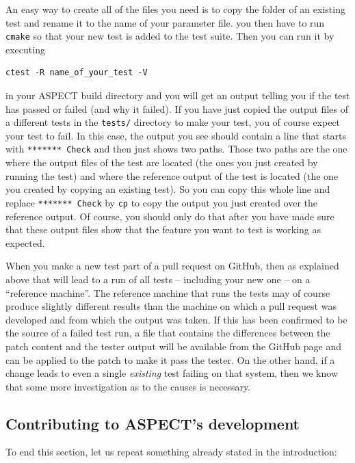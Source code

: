 \documentclass{article}
\newcommand{\aspect}{\textsc{ASPECT}}
\begin{document}
An easy way to create all of the files you need is to copy the folder of an existing 
test and rename it to the name of your parameter file. you then have to run \texttt{cmake}
so that your new test is added to the test suite. Then you can run it by executing 
\begin{lstlisting}[frame=single,language=ksh] 
    ctest -R name_of_your_test -V
\end{lstlisting}
in your \aspect{} build directory and you will get an output telling you if the test has 
passed or failed (and why it failed). If you have just copied the output files of a different 
tests in the \texttt{tests/} directory to make your test, you of course expect your test to fail. 
In this case, the output you see should contain a line that starts with \texttt{******* Check} 
and then just shows two paths. Those two paths are the one where the output files of the test 
are located (the ones you just created by running the test) and where the reference output of the 
test is located (the one you created by copying an existing test). So you can copy this whole line
and replace \texttt{******* Check} by \texttt{cp} to copy the output you just created over the 
reference output. Of course, you should only do that after you have made sure that these output 
files show that the feature you want to test is working as expected. 

When you make a new test part of a pull request on GitHub, then as explained
above that will lead to a run of all tests -- including your new one -- on a
``reference machine''. The reference machine that runs the tests may of course
produce slightly different results than the machine on which a pull request was
developed and from which the output was taken. If this has been confirmed to be
the source of a failed test run, a file that contains the differences between
the patch content and the tester output will be available from the GitHub page
and can be applied to the patch to make it pass the tester. On the other hand,
if a change leads to even a single \textit{existing} test failing on that
system, then we know that some more investigation as to the causes is necessary.


\subsection{Contributing to \aspect{}'s development}

To end this section, let us repeat something already stated in the
introduction:
\end{document}
